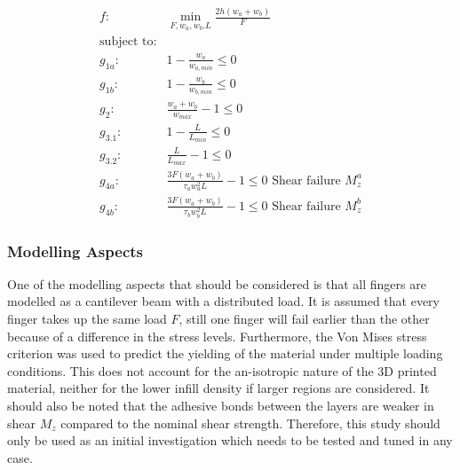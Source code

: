 \begin{align*}
	f: & \min_{F, {w_a}, {w_b}. L}  \frac{2h \left(w_a + w_b\right)}{F} \nonumber \\
	\text{subject to:} & \nonumber \\
	g_{1a}:& 1 - \frac{w_a}{w_{a,min}}  \le 0 \\
	g_{1b}:& 1 - \frac{w_b}{w_{b,min}}  \le 0 \\
	g_2:& \frac{w_a + w_b}{w_{max}}  - 1 \le 0 \\
	g_{3.1}:& 1 - \frac{L}{L_{min}} \le 0 \\
	g_{3.2}:&\frac{L}{L_{max}} - 1  \le 0 \\
	g_{4a}: & \frac{ 3 F \left(w_a + w_b \right) }{ \tau_a w_a ^2 L} - 1 \le 0					\text{ Shear failure } M_z^a \\
	g_{4b}: & \frac{ 3 F \left(w_a + w_b \right) }{ \tau_b w_b ^2 L} - 1 \le 0					\text{ Shear failure } M_z^b 
\end{align*}	
\vspace{-8mm}
\begin{table}[H]
\end{table}



\subsubsection{Modelling Aspects}
One of the modelling aspects that should be considered is that all fingers are modelled as a cantilever beam with a distributed load. It is assumed that every finger takes up the same load $F$, still one finger will fail earlier than the other because of a difference in the stress levels. Furthermore, the Von Mises stress criterion was used to predict the yielding of the material under multiple loading conditions. This does not account for the an-isotropic nature of the 3D printed material, neither for the lower infill density if larger regions are considered. It should also be noted that the adhesive bonds between the layers are weaker in shear $M_z$ compared to the nominal shear strength. Therefore, this study should only be used as an initial investigation which needs to be tested and tuned in any case.

